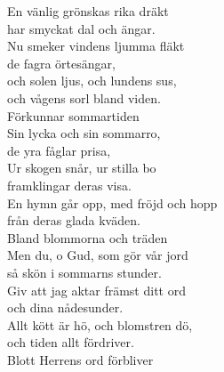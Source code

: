 \documentclass[a6paper,10pt]{article}
\begin{document}
\setlength{\oddsidemargin}{-0.47in}
\noindent
\begin{center}
\end{center}
\begin{lyrics}
En vänlig grönskas rika dräkt\\
har smyckat dal och ängar.\\
Nu smeker vindens ljumma fläkt\\
de fagra örtesängar,\\
och solen ljus, och lundens sus,\\
och vågens sorl bland viden.\\
Förkunnar sommartiden
\vspace{5pt}\\
Sin lycka och sin sommarro,\\
de yra fåglar prisa,\\
Ur skogen snår, ur stilla bo\\
framklingar deras visa.\\
En hymn går opp, med fröjd och hopp\\
från deras glada kväden.\\
Bland blommorna och träden
\vspace{5pt}\\
Men du, o Gud, som gör vår jord\\
så skön i sommarns stunder.\\
Giv att jag aktar främst ditt ord\\
och dina nådesunder.\\
Allt kött är hö, och blomstren dö,\\
och tiden allt fördriver.\\
Blott Herrens ord förbliver
\end{lyrics}
\end{document}
